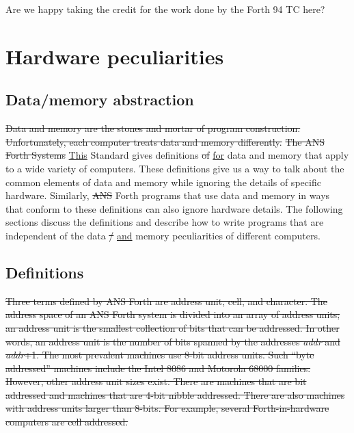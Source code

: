 \begin{editor}
Are we happy taking the credit for the work done by the Forth 94 TC here?
\end{editor}

\section{Hardware peculiarities} %
\label{port:hardware}

\subsection{Data/memory abstraction} %

\sout{Data and memory are the stones and mortar of program construction.
Unfortunately, each computer treats data and memory differently.}
\sout{The ANS Forth Systems} \uline{This} Standard gives definitions \sout{of} \uline{for} data and memory that
apply to a wide variety of computers. These definitions give us a way
to talk about the common elements of data and memory while ignoring
the details of specific hardware. Similarly, \sout{ANS} Forth programs that
use data and memory in ways that conform to these definitions can
also ignore hardware details. The following sections discuss the
definitions and describe how to write programs that are independent
of the data \sout{/} \uline{and} memory peculiarities of different computers.

\subsection{Definitions} %

\sout{%
Three terms defined by ANS Forth are address unit, cell, and character.
The address space of an ANS Forth system is divided into an array of
address units; an address unit is the smallest collection of bits that
can be addressed. In other words, an address unit is the number of
bits spanned by the addresses \emph{addr} and \emph{addr}+1. The most
prevalent machines use 8-bit address units. Such ``byte addressed''
machines include the Intel 8086 and Motorola 68000 families. However,
other address unit sizes exist. There are machines that are bit
addressed and machines that are 4-bit nibble addressed. There are
also machines with address units larger than 8-bits. For example,
several Forth-in-hardware computers are cell addressed.}

